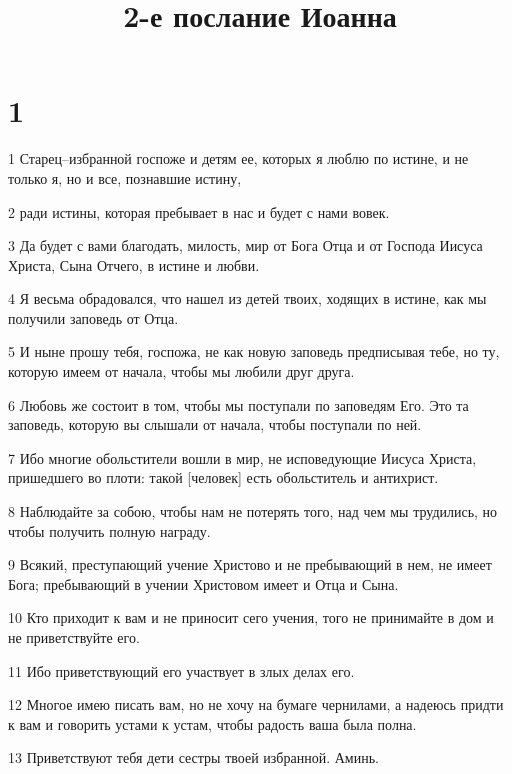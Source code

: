

\title{2-е послание Иоанна}


\chapter{1}

\par 1 Старец--избранной госпоже и детям ее, которых я люблю по истине, и не только я, но и все, познавшие истину,
\par 2 ради истины, которая пребывает в нас и будет с нами вовек.
\par 3 Да будет с вами благодать, милость, мир от Бога Отца и от Господа Иисуса Христа, Сына Отчего, в истине и любви.
\par 4 Я весьма обрадовался, что нашел из детей твоих, ходящих в истине, как мы получили заповедь от Отца.
\par 5 И ныне прошу тебя, госпожа, не как новую заповедь предписывая тебе, но ту, которую имеем от начала, чтобы мы любили друг друга.
\par 6 Любовь же состоит в том, чтобы мы поступали по заповедям Его. Это та заповедь, которую вы слышали от начала, чтобы поступали по ней.
\par 7 Ибо многие обольстители вошли в мир, не исповедующие Иисуса Христа, пришедшего во плоти: такой [человек] есть обольститель и антихрист.
\par 8 Наблюдайте за собою, чтобы нам не потерять того, над чем мы трудились, но чтобы получить полную награду.
\par 9 Всякий, преступающий учение Христово и не пребывающий в нем, не имеет Бога; пребывающий в учении Христовом имеет и Отца и Сына.
\par 10 Кто приходит к вам и не приносит сего учения, того не принимайте в дом и не приветствуйте его.
\par 11 Ибо приветствующий его участвует в злых делах его.
\par 12 Многое имею писать вам, но не хочу на бумаге чернилами, а надеюсь придти к вам и говорить устами к устам, чтобы радость ваша была полна.
\par 13 Приветствуют тебя дети сестры твоей избранной. Аминь.


